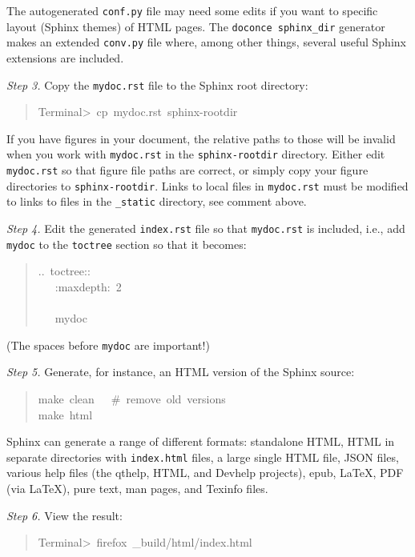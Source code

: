 \documentclass[a4paper]{article}
\begin{document}
The autogenerated \texttt{conf.py} file
may need some edits if you want to specific layout (Sphinx themes)
of HTML pages. The \texttt{doconce sphinx\_dir} generator makes an extended \texttt{conv.py}
file where, among other things, several useful Sphinx extensions
are included.

\emph{Step 3.} Copy the \texttt{mydoc.rst} file to the Sphinx root directory:
%
\begin{quote}{\ttfamily \raggedright \noindent
Terminal>~cp~mydoc.rst~sphinx-rootdir
}
\end{quote}

If you have figures in your document, the relative paths to those will
be invalid when you work with \texttt{mydoc.rst} in the \texttt{sphinx-rootdir}
directory. Either edit \texttt{mydoc.rst} so that figure file paths are correct,
or simply copy your figure directories to \texttt{sphinx-rootdir}.
Links to local files in \texttt{mydoc.rst} must be modified to links to
files in the \texttt{\_static} directory, see comment above.

\emph{Step 4.} Edit the generated \texttt{index.rst} file so that \texttt{mydoc.rst}
is included, i.e., add \texttt{mydoc} to the \texttt{toctree} section so that it becomes:
%
\begin{quote}{\ttfamily \raggedright \noindent
..~toctree::\\
~~~:maxdepth:~2\\
~\\
~~~mydoc
}
\end{quote}

(The spaces before \texttt{mydoc} are important!)

\emph{Step 5.} Generate, for instance, an HTML version of the Sphinx source:
%
\begin{quote}{\ttfamily \raggedright \noindent
make~clean~~~\#~remove~old~versions\\
make~html
}
\end{quote}

Sphinx can generate a range of different formats:
standalone HTML, HTML in separate directories with \texttt{index.html} files,
a large single HTML file, JSON files, various help files (the qthelp, HTML,
and Devhelp projects), epub, LaTeX, PDF (via LaTeX), pure text, man pages,
and Texinfo files.

\emph{Step 6.} View the result:
%
\begin{quote}{\ttfamily \raggedright \noindent
Terminal>~firefox~\_build/html/index.html
}
\end{quote}
\end{document}
